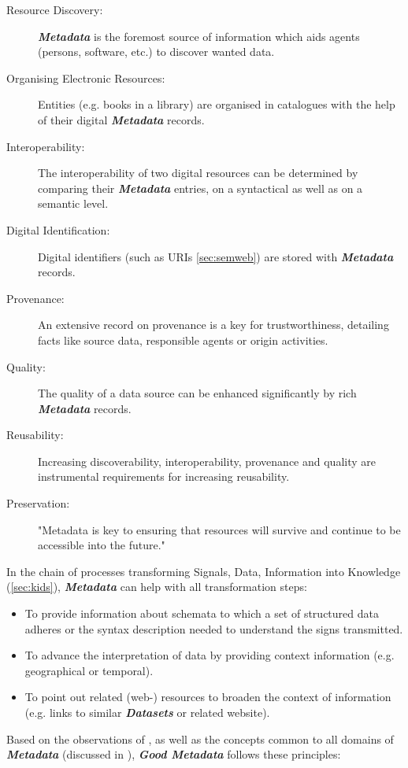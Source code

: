 \documentclass[a4paper,english,twoside,BCOR1.5cm,headsepline,DIV12,appendixprefix,final,12pt]{scrbook}
\newcommand{\important}[1]{\textbf{\textit{#1}}}
\begin{document}
\begin{description}
\item [Resource Discovery:] \important{Metadata} is the foremost source of information which aids agents (persons, software, etc.) to discover wanted data.
\item [Organising Electronic Resources:] Entities (e.g. books in a library) are organised in catalogues with the help of their digital \important{Metadata} records.
\item [Interoperability:] The interoperability of two digital resources can be determined by comparing their \important{Metadata} entries, on a syntactical as well as on a semantic level.
\item [Digital Identification:] Digital identifiers (such as URIs \cref{sec:semweb}) are stored with \important{Metadata} records.
\item [Provenance:] An extensive record on provenance is a key for trustworthiness, detailing facts like source data, responsible agents or origin activities.
\item [Quality:] The quality of a data source can be enhanced significantly by rich \important{Metadata} records.
\item [Reusability:] Increasing discoverability, interoperability, provenance and quality are instrumental requirements for increasing reusability. 
\item [Preservation:] "Metadata is key to ensuring that resources will survive and continue to be accessible into the future." \cite{NISO2004}
\end{description}

In the chain of processes transforming Signals, Data, Information into Knowledge (\cref{sec:kids}), \important{Metadata} can help with all transformation steps:

\begin{itemize}
\item To provide information about schemata to which a set of structured data adheres or the syntax description needed to understand the signs transmitted.
\item To advance the interpretation of data by providing context information (e.g. geographical or temporal).
\item To point out related (web-) resources to broaden the context of information (e.g. links to similar \important{Datasets} or related website).
\end{itemize}

Based on the observations of \cite{NISO2004}, as well as the concepts common to all domains of \important{Metadata} (discussed in \cite{MetadataPrinciples}), \important{Good Metadata} follows these principles:
\end{document}
